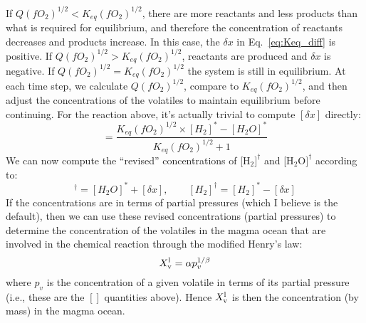 If $Q(fO_2)^{1/2} < K_{eq}(fO_2)^{1/2}$, there are more reactants and less products than what is required for equilibrium, and therefore the concentration of reactants decreases and products increase.  In this case, the $\delta x$ in Eq.~\ref{eq:Keq_diff} is positive. If $Q(fO_2)^{1/2} > K_{eq}(fO_2)^{1/2}$, reactants are produced and $\delta x$ is negative.  If $Q(fO_2)^{1/2} = K_{eq}(fO_2)^{1/2}$ the system is still in equilibrium.  At each time step, we calculate $Q(fO_2)^{1/2}$, compare to $K_{eq}(fO_2)^{1/2}$, and then adjust the concentrations of the volatiles to maintain equilibrium before continuing.  For the reaction above, it's actually trivial to compute $[\delta x]$ directly:
\begin{equation}
[\delta x] = \frac{K_{eq} (fO_2)^{1/2} \times [H_2]^\ast - [H_2O]^\ast }{K_{eq} (fO_2)^{1/2} + 1}
\label{eq:Keq_diff_solve}
\end{equation}
We can now compute the ``revised'' concentrations of [H$_2]^\dagger$ and [H$_2$O$]^\dagger$ according to:
\begin{equation}
[H_2O]^\dagger = [H_2O]^\ast + [\delta x], \qquad [H_2]^\dagger = [H_2]^\ast - [\delta x]
\end{equation}
If the concentrations are in terms of partial pressures (which I believe is the default), then we can use these revised concentrations (partial pressures) to determine the concentration of the volatiles in the magma ocean that are involved in the chemical reaction through the modified Henry's law:
\begin{equation}
X_{\rm v}^{\rm l} = \alpha p_v^{1/\beta} %
\label{eq:Henry_mod_invert}
\end{equation}
where $p_v$ is the concentration of a given volatile in terms of its partial pressure (i.e., these are the $[]$ quantities above).  Hence $X_{\rm v}^{\rm l}$ is then the concentration (by mass) in the magma ocean.  
